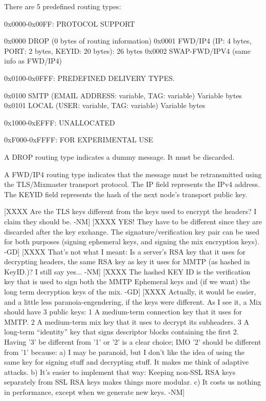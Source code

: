 There are 5 predefined routing types:

0x0000-0x00FF: PROTOCOL SUPPORT

0x0000 DROP    (0 bytes of routing information)
0x0001 FWD/IP4 (IP: 4 bytes, PORT: 2 bytes, KEYID: 20 bytes): 26 bytes
0x0002 SWAP-FWD/IPV4 (same info as FWD/IP4)

0x0100-0x0FFF: PREDEFINED DELIVERY TYPES.

0x0100 SMTP   (EMAIL ADDRESS: variable, TAG: variable) Variable bytes
0x0101 LOCAL  (USER: variable, TAG: variable) Variable bytes

0x1000-0xEFFF: UNALLOCATED

0xF000-0xFFFF: FOR EXPERIMENTAL USE

A DROP routing type indicates a dummy message. It must be discarded.

A FWD/IP4 routing type indicates that the message must be
retransmitted using the TLS/Mixmaster transport protocol. The IP field
represents the IPv4 address.  The KEYID field represents the hash of
the next node's transport public key.

[XXXX Are the TLS keys different from the keys used to encrypt the
      headers?  I claim they should be. -NM]
[XXXX YES! They have to be different since they are discarded after
      the key exchange. The signature/verification key pair can be
      used for both purposes (signing ephemeral keys, and signing the
      mix encryption keys). -GD]
[XXXX That's not what I meant:  Is a server's RSA key that it uses 
      for decrypting headers, the same RSA key as key it uses for
      MMTP (as hashed in KeyID.)?  I still say yes... -NM]
[XXXX The hashed KEY ID is the verification key that is used to sign
      both the MMTP Ephemeral keys and (if we want) the long term
      decryption keys of the mix. -GD]
[XXXX Actually, it would be easier, and a little less paranoia-engendering,
      if the keys were different.  As I see it, a Mix should have 3
      public keys:
              1  A medium-term connection key that it uses for MMTP.
              2  A medium-term mix key that it uses to decrypt 
                 its subheaders.
              3  A long-term ``identity'' key that signs descriptor
                 blocks containing the first 2.
         Having '3' be different from '1' or '2' is a clear choice; 
         IMO '2' should be different from '1' because:
                a) I may be paranoid, but I don't like the idea of 
                   using the same key for signing stuff and decrypting
                   stuff.  It makes me think of adaptive attacks.
                b) It's easier to implement that way: Keeping non-SSL 
                   RSA keys separately from SSL RSA keys makes things
                   more modular.
                c) It costs us nothing in performance, except when
                   we generate new keys.
             -NM]

